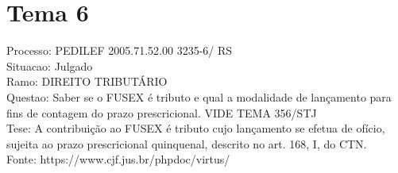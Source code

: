 \documentclass[12pt]{article}
\begin{document}
\section*{Tema 6}
Processo: PEDILEF 2005.71.52.00 3235-6/ RS\\
Situacao: Julgado\\
Ramo: DIREITO TRIBUTÁRIO\\
Questao: Saber se o FUSEX é tributo e qual a modalidade de lançamento para fins de contagem do prazo prescricional. VIDE TEMA 356/STJ\\
Tese: A contribuição ao FUSEX é tributo cujo lançamento se efetua de ofício, sujeita ao prazo prescricional quinquenal, descrito no art. 168, I, do CTN.\\
Fonte: https://www.cjf.jus.br/phpdoc/virtus/
\end{document}
